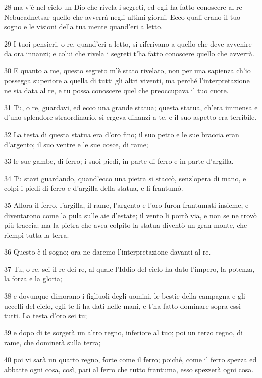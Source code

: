 \par 28 ma v'è nel cielo un Dio che rivela i segreti, ed egli ha fatto conoscere al re Nebucadnetsar quello che avverrà negli ultimi giorni. Ecco quali erano il tuo sogno e le visioni della tua mente quand'eri a letto.
\par 29 I tuoi pensieri, o re, quand'eri a letto, si riferivano a quello che deve avvenire da ora innanzi; e colui che rivela i segreti t'ha fatto conoscere quello che avverrà.
\par 30 E quanto a me, questo segreto m'è stato rivelato, non per una sapienza ch'io possegga superiore a quella di tutti gli altri viventi, ma perché l'interpretazione ne sia data al re, e tu possa conoscere quel che preoccupava il tuo cuore.
\par 31 Tu, o re, guardavi, ed ecco una grande statua; questa statua, ch'era immensa e d'uno splendore straordinario, si ergeva dinanzi a te, e il suo aspetto era terribile.
\par 32 La testa di questa statua era d'oro fino; il suo petto e le sue braccia eran d'argento; il suo ventre e le sue cosce, di rame;
\par 33 le sue gambe, di ferro; i suoi piedi, in parte di ferro e in parte d'argilla.
\par 34 Tu stavi guardando, quand'ecco una pietra si staccò, senz'opera di mano, e colpì i piedi di ferro e d'argilla della statua, e li frantumò.
\par 35 Allora il ferro, l'argilla, il rame, l'argento e l'oro furon frantumati insieme, e diventarono come la pula sulle aie d'estate; il vento li portò via, e non se ne trovò più traccia; ma la pietra che avea colpito la statua diventò un gran monte, che riempì tutta la terra.
\par 36 Questo è il sogno; ora ne daremo l'interpretazione davanti al re.
\par 37 Tu, o re, sei il re dei re, al quale l'Iddio del cielo ha dato l'impero, la potenza, la forza e la gloria;
\par 38 e dovunque dimorano i figliuoli degli uomini, le bestie della campagna e gli uccelli del cielo, egli te li ha dati nelle mani, e t'ha fatto dominare sopra essi tutti. La testa d'oro sei tu;
\par 39 e dopo di te sorgerà un altro regno, inferiore al tuo; poi un terzo regno, di rame, che dominerà sulla terra;
\par 40 poi vi sarà un quarto regno, forte come il ferro; poiché, come il ferro spezza ed abbatte ogni cosa, così, pari al ferro che tutto frantuma, esso spezzerà ogni cosa.
